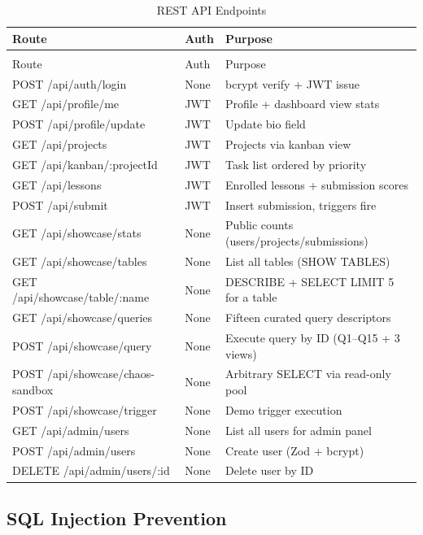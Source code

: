 \documentclass[12pt,a4paper]{article}
\begin{document}
\begin{longtable}{>{\ttfamily}p{5cm} p{1.5cm} p{6cm}}
\caption{REST API Endpoints}
\label{tab:api} \\
\toprule
Route & Auth & Purpose \\
\midrule
\endfirsthead
\multicolumn{3}{c}{\tablename\ \thetable{} -- continued} \\
\toprule
Route & Auth & Purpose \\
\midrule
\endhead
\bottomrule
\endlastfoot
POST /api/auth/login & None & bcrypt verify + JWT issue \\[4pt]
GET /api/profile/me & JWT & Profile + dashboard view stats \\[4pt]
POST /api/profile/update & JWT & Update bio field \\[4pt]
GET /api/projects & JWT & Projects via kanban view \\[4pt]
GET /api/kanban/:projectId & JWT & Task list ordered by priority \\[4pt]
GET /api/lessons & JWT & Enrolled lessons + submission scores \\[4pt]
POST /api/submit & JWT & Insert submission, triggers fire \\[4pt]
GET /api/showcase/stats & None & Public counts (users/projects/submissions) \\[4pt]
GET /api/showcase/tables & None & List all tables (SHOW TABLES) \\[4pt]
GET /api/showcase/table/:name & None & DESCRIBE + SELECT LIMIT 5 for a table \\[4pt]
GET /api/showcase/queries & None & Fifteen curated query descriptors \\[4pt]
POST /api/showcase/query & None & Execute query by ID (Q1--Q15 + 3 views) \\[4pt]
POST /api/showcase/chaos-sandbox & None & Arbitrary SELECT via read-only pool \\[4pt]
POST /api/showcase/trigger & None & Demo trigger execution \\[4pt]
GET /api/admin/users & None & List all users for admin panel \\[4pt]
POST /api/admin/users & None & Create user (Zod + bcrypt) \\[4pt]
DELETE /api/admin/users/:id & None & Delete user by ID \\[4pt]
\end{longtable}

\subsection{SQL Injection Prevention}
\end{document}
